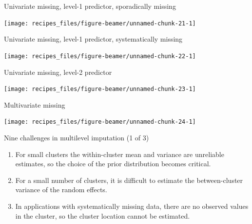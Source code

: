 \documentclass[ignorenonframetext,aspectratio=43]{beamer}
\begin{document}
\begin{frame}{Univariate missing, level-1 predictor, sporadically
missing}

\begin{center}\texttt{[image: recipes\_files/figure-beamer/unnamed-chunk-21-1]} \end{center}

\end{frame}

\begin{frame}{Univariate missing, level-1 predictor, systematically
missing}

\begin{center}\texttt{[image: recipes\_files/figure-beamer/unnamed-chunk-22-1]} \end{center}

\end{frame}

\begin{frame}{Univariate missing, level-2 predictor}

\begin{center}\texttt{[image: recipes\_files/figure-beamer/unnamed-chunk-23-1]} \end{center}

\end{frame}

\begin{frame}{Multivariate missing}

\begin{center}\texttt{[image: recipes\_files/figure-beamer/unnamed-chunk-24-1]} \end{center}

\end{frame}

\begin{frame}{Nine challenges in multilevel imputation (1 of 3)}

\begin{enumerate}
\def\labelenumi{\arabic{enumi}.}
\item
  For small clusters the within-cluster mean and variance are unreliable
  estimates, so the choice of the prior distribution becomes critical.
\item
  For a small number of clusters, it is difficult to estimate the
  between-cluster variance of the random effects.
\item
  In applications with systematically missing data, there are no
  observed values in the cluster, so the cluster location cannot be
  estimated.
\end{enumerate}

\end{frame}
\end{document}
